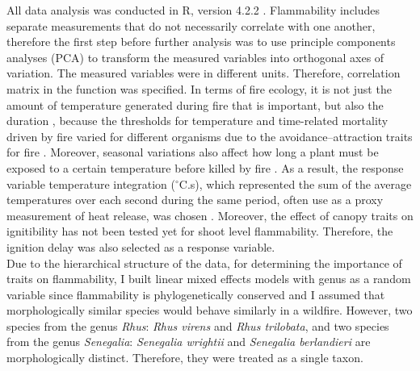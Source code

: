 \documentclass[12pt]{report}
\begin{document}
All data analysis was conducted in R, version 4.2.2 \citep{R}. 
Flammability includes separate measurements that do not necessarily correlate with one another, therefore the first step before further analysis was to use principle components analyses (PCA) to transform the measured variables into orthogonal axes of variation. The measured variables were in different units. Therefore, correlation matrix in the  function was specified. In terms of fire ecology, it is not just the amount of temperature generated during fire that is important, but also the duration \citep{mcgranahan2020inconvenient}, because the thresholds for temperature and time-related mortality driven by fire varied for different organisms \citep{nelson1952observations,vines1968heat, bond1983dead, hengst1994bark,pinard1997fire,lawes2011bark, pingree2019myth} due to the avoidance–attraction traits for fire \citep{schwilk2001flammability, archibald2019unified}. Moreover, seasonal variations also affect how long a plant must be exposed to a certain temperature before killed by fire \citep{wright1970method}. As a result, the response variable temperature integration ($^{\circ}$C.s), which represented the sum of the average temperatures over each second during the same period, often use as a proxy measurement of heat release, was chosen \citep{gao2018grass, mcgranahan2020inconvenient}. Moreover, the effect of canopy traits on ignitibility has not been tested yet for shoot level flammability. Therefore, the ignition delay was also selected as a response variable.\\

Due to the hierarchical structure of the data, for determining the importance of traits on flammability, I built linear mixed effects models with genus as a random variable since flammability is phylogenetically conserved \citep{cui2020shoot} and I assumed that morphologically similar species would behave similarly in a wildfire. However, two species from the genus \emph{Rhus}: \emph{Rhus virens} and \emph{Rhus trilobata}, and two species from the genus \emph{Senegalia}: \emph{Senegalia wrightii} and \emph{Senegalia berlandieri} are morphologically distinct. Therefore, they were treated as a single taxon. 



\end{document}
